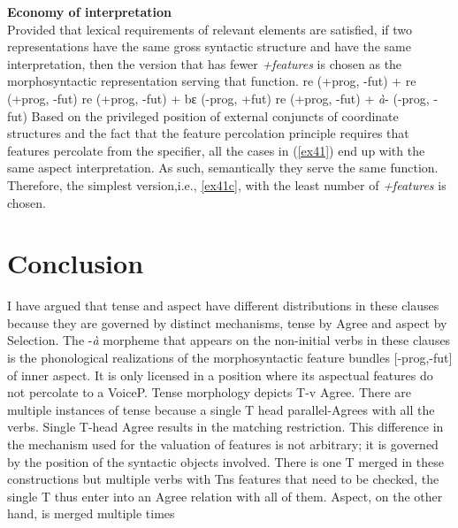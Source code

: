 \documentclass[output=paper,colorlinks,citecolor=brown]{langscibook}
\begin{document}
\ea
\textbf{Economy of interpretation}\\Provided that lexical requirements of relevant elements are satisfied, if two representations have the same gross syntactic structure and have the same interpretation, then the version that has fewer \emph{+features} is chosen as the morphosyntactic representation serving that function.
\z
\ea \label{ex41}
\ea  *re  (+prog, -fut) + re  (+prog, -fut)  
\ex *re (+prog, -fut) + bɛ (-prog, +fut)
	\ex \label{ex41c} re (+prog, -fut) + \emph{\`a}- (-prog, -fut)
\z
\z
Based on the privileged position of external conjuncts of coordinate structures and the fact that the feature percolation principle requires that features percolate from the specifier, all the cases in (\ref{ex41}) end up with the same aspect interpretation. As such, semantically they serve the same function. Therefore, the simplest version,i.e., \ref{ex41c}, with the least number of \emph{+features} is chosen. 


\section{Conclusion}
I have argued that tense and aspect have different distributions in these clauses because they are governed by distinct mechanisms, tense by Agree and aspect by Selection. The -\emph{\`a} morpheme that appears on the non-initial verbs in these clauses is the phonological realizations of the morphosyntactic feature bundles [-prog,-fut] of inner aspect. It is only licensed in a position where its aspectual features do not percolate to a VoiceP. Tense morphology depicts T-v Agree. There are multiple instances of tense because a single T head parallel-Agrees with all the verbs. Single T-head Agree results in the matching restriction. This difference in the mechanism used for the valuation of features is not arbitrary; it is governed by the position of the syntactic objects involved. There is one T merged in these constructions but multiple verbs with Tns features that need to be checked, the single T thus enter into an Agree relation with all of them.  Aspect, on the other hand,  is merged multiple times 



\end{document}
